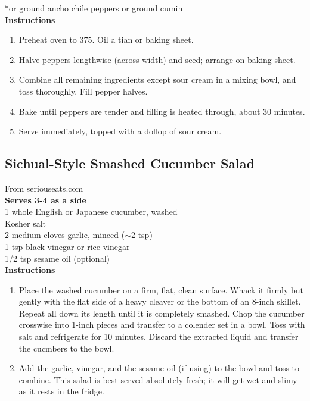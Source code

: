 \documentclass{article}
\numberwithin{figure}{section}
\numberwithin{equation}{section}
\begin{document}
*or ground  ancho chile peppers or ground cumin\\

{\bf Instructions}
\begin{enumerate}
\item Preheat oven to 375.  Oil a tian or baking sheet.
\item Halve peppers lengthwise (across width) and seed; arrange on baking sheet.
\item Combine all remaining ingredients except sour cream in a mixing bowl, and toss thoroughly.  Fill pepper halves.
\item Bake until peppers are tender and filling is heated through, about 30 minutes.
\item Serve immediately, topped with a dollop of sour cream.
\end{enumerate}

\pagebreak
\subsection{Sichual-Style Smashed Cucumber Salad}
From seriouseats.com\\

{\bf Serves 3-4 as a side}\\
1 whole English or Japanese cucumber, washed\\
Kosher salt\\
2 medium cloves garlic, minced ($\sim$2 tsp)\\
1 tsp black vinegar or rice vinegar\\
1/2 tsp sesame oil (optional)\\

{\bf Instructions}
\begin{enumerate}
\item Place the washed cucumber on a firm, flat, clean surface. Whack it firmly but gently with the flat side of a heavy cleaver or the bottom of an 8-inch skillet. Repeat all down its length until it is completely smashed. Chop the cucumber crosswise into 1-inch pieces and transfer to a colender set in a bowl. Toss with salt and refrigerate for 10 minutes. Discard the extracted liquid and transfer the cucmbers to the bowl.
\item Add the garlic, vinegar, and the sesame oil (if using) to the bowl and toss to combine. This salad is best served absolutely fresh; it will get wet and slimy as it rests in the fridge.
\end{enumerate}

\pagebreak
\end{document}
